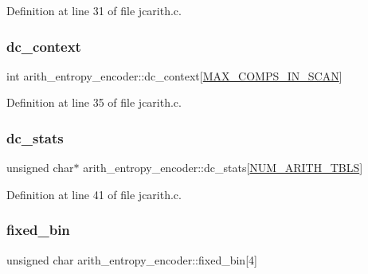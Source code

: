 Definition at line 31 of file jcarith.\+c.

\mbox{\label{structarith__entropy__encoder_a1f8bc39ac0327ddbf46c65434d0ceb75}} 
\subsubsection{\texorpdfstring{dc\_context}{dc\_context}}
{\footnotesize\ttfamily int arith\+\_\+entropy\+\_\+encoder\+::dc\+\_\+context\mbox{[}\mbox{\hyperlink{jpeglib_8h_adc7013da016c19051dc623fb3d8b35b4}{M\+A\+X\+\_\+\+C\+O\+M\+P\+S\+\_\+\+I\+N\+\_\+\+S\+C\+AN}}\mbox{]}}



Definition at line 35 of file jcarith.\+c.

\mbox{\label{structarith__entropy__encoder_add54e8b278b9eea4aa6ee85ea2de4307}} 
\subsubsection{\texorpdfstring{dc\_stats}{dc\_stats}}
{\footnotesize\ttfamily unsigned char$\ast$ arith\+\_\+entropy\+\_\+encoder\+::dc\+\_\+stats\mbox{[}\mbox{\hyperlink{jpeglib_8h_a4efb0fccc8d9db72ca18f32a26fad6ab}{N\+U\+M\+\_\+\+A\+R\+I\+T\+H\+\_\+\+T\+B\+LS}}\mbox{]}}



Definition at line 41 of file jcarith.\+c.

\mbox{\label{structarith__entropy__encoder_a06cb7a9a6db5a785f6630e5b5606ae5d}} 
\subsubsection{\texorpdfstring{fixed\_bin}{fixed\_bin}}
{\footnotesize\ttfamily unsigned char arith\+\_\+entropy\+\_\+encoder\+::fixed\+\_\+bin\mbox{[}4\mbox{]}}



